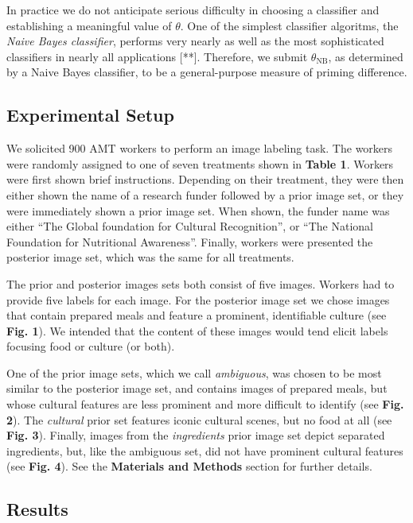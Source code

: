 \documentclass[a4paper]{report}
\begin{document}
In practice we do not anticipate serious difficulty in choosing a classifier
and establishing a meaningful value of $\theta$.  One of the simplest 
classifier algoritms, the \textit{Naive Bayes classifier}, performs very 
nearly as well as the most sophisticated classifiers in nearly all 
applications [**].  Therefore, we submit $\theta_\text{NB}$, as determined by 
a Naive Bayes classifier, to be a general-purpose measure of priming 
difference.  



\subsection*{Experimental Setup}
We solicited 900 AMT workers to perform an image labeling task.  The workers
were randomly assigned to one of seven treatments shown in 
\textbf{Table 1}.  Workers were first shown brief instructions.
Depending on their treatment, they were then either shown the name of 
a research funder followed by a prior image set, or they were immediately 
shown a prior image set. When shown, the funder name was either
``The Global foundation for Cultural Recognition'', or 
``The National Foundation for Nutritional Awareness''.  Finally, workers were 
presented the posterior image set, which was the same for all treatments.

The prior and posterior images sets both consist of five images. Workers had
to provide five labels for each image.  For the posterior image set we chose 
images that contain prepared meals and feature a prominent, identifiable 
culture (see \textbf{Fig. 1}).  We intended that the content of these images 
would tend elicit labels focusing food or culture (or both).

One of the prior image sets, which we call \textit{ambiguous}, was chosen to
be most similar to the posterior image set, and contains images of prepared
meals, but whose cultural features are less prominent and more difficult to
identify (see \textbf{Fig. 2}).  
The \textit{cultural} prior set features iconic cultural scenes, but no food 
at all (see \textbf{Fig. 3}).  Finally, images from
the \textit{ingredients} prior image set depict separated ingredients, but, 
like the ambiguous set, did not have prominent cultural features (see 
\textbf{Fig. 4}).  See the \textbf{Materials and Methods} section for further 
details.

\subsection*{Results}
\end{document}
